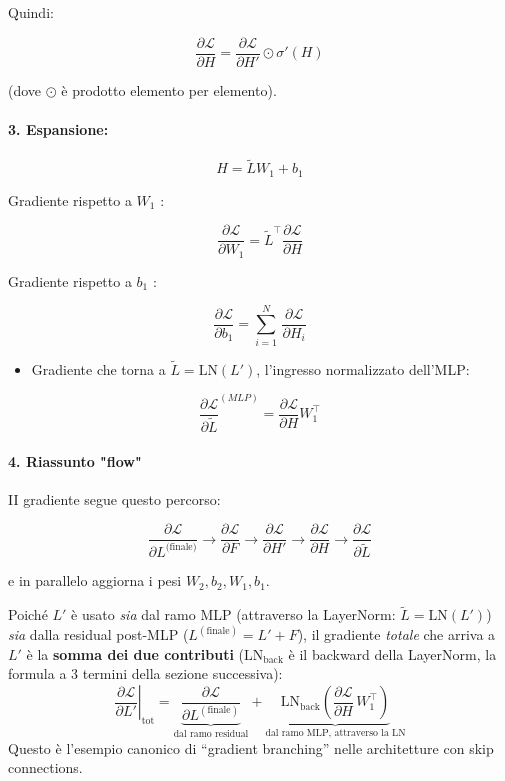 \documentclass[
  11pt,
]{article}
\begin{document}
Quindi:

\[\frac{\partial\mathcal{L}}{\partial H} = \frac{\partial\mathcal{L}}{\partial H'} \odot \sigma'(H)\]

(dove \(\odot\) è prodotto elemento per elemento).


\paragraph{3. \textbf{Espansione}:}


\[H = \widetilde{L}W_{1} + b_{1}\]


Gradiente rispetto a \(W_{1}\) :


\[\frac{\partial\mathcal{L}}{\partial W_{1}} = {\widetilde{L}}^{\top}\frac{\partial\mathcal{L}}{\partial H}\]


Gradiente rispetto a \(b_{1}\) :


\[\frac{\partial\mathcal{L}}{\partial b_{1}} = \sum_{i = 1}^{N}\,\frac{\partial\mathcal{L}}{\partial H_{i}}\]


\begin{itemize}
\item
  Gradiente che torna a \(\widetilde{L} = \mathrm{LN}(L')\), l'ingresso normalizzato dell'MLP:
\end{itemize}


\[\frac{\partial\mathcal{L}}{\partial\widetilde{L}}^{(MLP)} = \frac{\partial\mathcal{L}}{\partial H}W_{1}^{\top}\]


\paragraph{4. \textbf{Riassunto "flow"}}


II gradiente segue questo percorso:

\[\frac{\partial\mathcal{L}}{\partial L^{\text{(finale)}}} \longrightarrow \frac{\partial\mathcal{L}}{\partial F} \longrightarrow \frac{\partial\mathcal{L}}{\partial H'} \longrightarrow \frac{\partial\mathcal{L}}{\partial H} \longrightarrow \frac{\partial\mathcal{L}}{\partial\widetilde{L}}\]

e in parallelo aggiorna i pesi \(W_{2},b_{2},W_{1},b_{1}\).

\begin{notabox}[title={\textbf{Attenzione: gradiente totale su $\widetilde{L}$}}]
Poiché $L'$ è usato \emph{sia} dal ramo MLP (attraverso la LayerNorm: $\widetilde{L} = \mathrm{LN}(L')$) \emph{sia} dalla residual post-MLP ($L^{(\text{finale})} = L' + F$), il gradiente \emph{totale} che arriva a $L'$ è la \textbf{somma dei due contributi} ($\mathrm{LN}_{\text{back}}$ è il backward della LayerNorm, la formula a 3 termini della sezione successiva):
\[
\left.\frac{\partial\mathcal{L}}{\partial L'}\right|_{\text{tot}} = \underbrace{\frac{\partial\mathcal{L}}{\partial L^{(\text{finale})}}}_{\text{dal ramo residual}} + \underbrace{\mathrm{LN}_{\text{back}}\!\left(\frac{\partial\mathcal{L}}{\partial H}\, W_1^\top\right)}_{\text{dal ramo MLP, attraverso la LN}}
\]
Questo è l'esempio canonico di ``gradient branching'' nelle architetture con skip connections.
\end{notabox}
\end{document}
